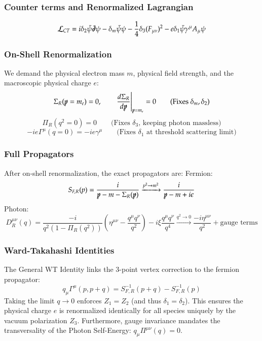 \documentclass{article}
\begin{document}
\subsubsection*{Counter terms and Renormalized Lagrangian}
\begin{equation}
    \mathcal{L}_{CT} = i\delta_2 \bar{\psi}\slashed{\partial}\psi - \delta_m \bar{\psi}\psi - \frac{1}{4}\delta_3 (F_{\mu\nu})^2 - e\delta_1 \bar{\psi}\gamma^\mu A_\mu \psi
\end{equation}
\subsubsection*{On-Shell Renormalization}
We demand the physical electron mass $m$, physical field strength, and the macroscopic physical charge $e$:
\begin{equation}
    \Sigma_R(\slashed{p}=m_e) = 0, \qquad \left.\frac{d\Sigma_R}{d\slashed{p}}\right|_{\slashed{p}=m_e} = 0 \qquad \text{(Fixes } \delta_m, \delta_2 \text{)}
\end{equation}
\begin{equation}
    \Pi_R(q^2=0) = 0 \qquad \text{(Fixes } \delta_3 \text{, keeping photon massless)}
\end{equation}
\begin{equation}
    -ie\Gamma^\mu(q=0) = -ie\gamma^\mu \qquad \text{(Fixes } \delta_1 \text{ at threshold scattering limit)}
\end{equation}
\subsubsection*{Full Propagators}
After on-shell renormalization, the exact propagators are:
Fermion:
\begin{equation}
    S_{F,R}(p) = \frac{i}{\slashed{p} - m - \Sigma_R(\slashed{p})} \xrightarrow{p^2 \to m^2} \frac{i}{\slashed{p} - m + i\epsilon}
\end{equation}
Photon:
\begin{equation}
    D^{\mu\nu}_R(q) = \frac{-i}{q^2(1 - \Pi_R(q^2))} \left( \eta^{\mu\nu} - \frac{q^\mu q^\nu}{q^2} \right) - i\xi \frac{q^\mu q^\nu}{q^4} \xrightarrow{q^2 \to 0} \frac{-i\eta^{\mu\nu}}{q^2} + \text{gauge terms}
\end{equation}
\subsubsection*{Ward-Takahashi Identities}
The General WT Identity links the 3-point vertex correction to the fermion propagator:
\begin{equation}
    q_\mu \Gamma^\mu(p, p+q) = S_{F,R}^{-1}(p+q) - S_{F,R}^{-1}(p)
\end{equation}
Taking the limit $q \to 0$ enforces $Z_1 = Z_2$ (and thus $\delta_1 = \delta_2$). This ensures the physical charge $e$ is renormalized identically for all species uniquely by the vacuum polarization $Z_3$. Furthermore, gauge invariance mandates the transversality of the Photon Self-Energy: $q_\mu \Pi^{\mu\nu}(q) = 0$.
\end{document}
